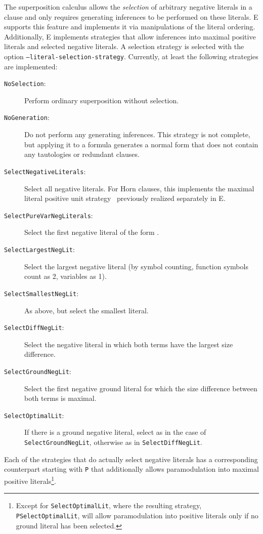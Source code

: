 \documentclass{report}
\begin{document}
The superposition calculus allows the
\emph{selection} of arbitrary negative
literals in a clause and only requires generating inferences to be
performed on these literals. E supports this feature and implements it
via manipulations of the literal ordering. Additionally, E implements
strategies that allow inferences into maximal positive literals and
selected negative literals. A selection strategy is selected with the
option \texttt{--literal-selection-strategy}.  Currently, at least the
following strategies are implemented:

\begin{description}
\item[\texttt{NoSelection}:]
 Perform ordinary superposition without selection.
\item[\texttt{NoGeneration}:] Do not perform any generating
  inferences. This strategy is not complete, but applying it to a
  formula generates a normal form that does not contain any
  tautologies or redundant clauses.
\item[\texttt{SelectNegativeLiterals}:] Select all negative literals. For Horn
  clauses, this implements the maximal literal positive unit
  strategy~\cite{Dershowitz:IJCAI-91} previously realized separately in
  E.
\item[\texttt{SelectPureVarNegLiterals}:] Select the first negative literal of
  the form .
\item[\texttt{SelectLargestNegLit}:] Select the largest negative literal (by
  symbol counting, function symbols count as 2, variables as 1).
\item[\texttt{SelectSmallestNegLit}:] As above, but select the smallest
  literal.
\item[\texttt{SelectDiffNegLit}:] Select the negative literal in which both
  terms have the largest size difference.
\item[\texttt{SelectGroundNegLit}:] Select the first negative ground literal
  for which the size difference between both terms is maximal.
\item[\texttt{SelectOptimalLit}:] If there is a ground negative literal, select
  as in the case of \texttt{SelectGroundNegLit}, otherwise as in
  \texttt{SelectDiffNegLit}.
\end{description}

Each of the strategies that do actually select negative literals has a
corresponding counterpart starting with \texttt{P} that additionally
allows paramodulation into maximal positive literals\footnote{Except
  for \texttt{SelectOptimalLit}, where the resulting strategy,
  \texttt{PSelectOptimalLit}, will allow paramodulation into positive
  literals only if no ground literal has been selected.}.
\end{document}

